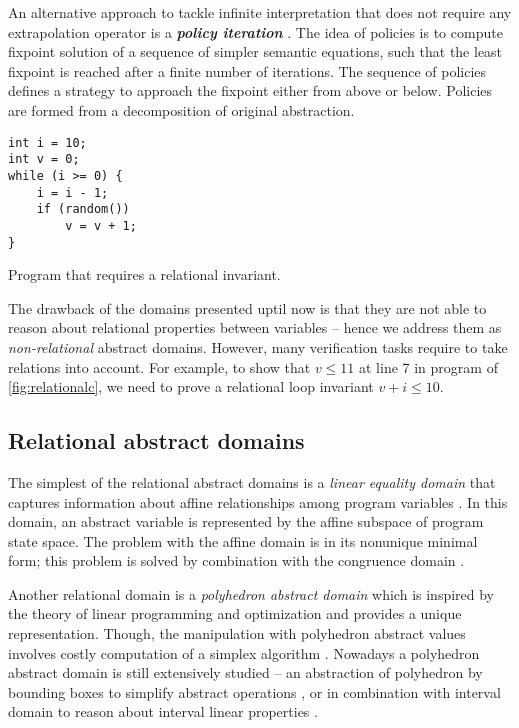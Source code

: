 An alternative approach to tackle infinite interpretation that does not require
any extrapolation operator is a \textbf{\emph{policy iteration}}
\cite{Costan2005, Gaubert2007, Gawlitza2007, Gawlitza2007b, Gawlitza2011}. The
idea of policies is to compute fixpoint solution of a sequence of simpler
semantic equations, such that the least fixpoint is reached after a finite
number of iterations.  The sequence of policies defines a strategy to approach
the fixpoint either from above or below. Policies are formed from a
decomposition of original abstraction.

\begin{marginfigure}
\begin{verbatim}
int i = 10;
int v = 0;
while (i >= 0) {
    i = i - 1;
    if (random())
        v = v + 1;
}
\end{verbatim}
    \caption{Program that requires a relational invariant.}
    \label{fig:relationalc}
\end{marginfigure}

The drawback of the domains presented uptil now is that they are not able to reason about
relational properties between variables -- hence we address them as
\emph{non-relational} abstract domains.
However, many verification tasks require to take relations into account.
For example, to show that $v \leq 11$ at line 7 in program of
\autoref{fig:relationalc}, we need to prove a relational loop invariant $v + i
\leq 10$.


\subsection{Relational abstract domains}

The simplest of the relational abstract domains is a \emph{linear equality
domain} that captures information about affine relationships among program
variables \cite{Karr1976}. In this domain, an abstract variable is represented
by the affine subspace of program state space. The problem with the affine
domain is in its nonunique minimal form; this problem is solved by combination
with the congruence domain \cite{Granger1991}.

Another relational domain is a \emph{polyhedron abstract domain} which is
inspired by the theory of linear programming and optimization \cite{Cousot1978, Venet2012}
and provides a unique representation. Though, the manipulation with polyhedron
abstract values involves costly computation of a simplex algorithm
\cite{Schrijver1986}. Nowadays a polyhedron abstract domain is still
extensively studied -- an abstraction of polyhedron by bounding boxes to
simplify abstract operations \cite{Singh2017}, or in combination with interval
domain to reason about interval linear properties \cite{Chen2009}.

